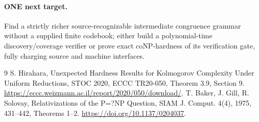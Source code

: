 \documentclass[11pt]{article}
\begin{document}
\paragraph{ONE next target.} Find a strictly richer source-recognizable intermediate congruence grammar without a supplied finite codebook; either build a polynomial-time discovery/coverage verifier or prove exact coNP-hardness of its verification gate, fully charging source and machine interfaces.

\begin{thebibliography}{9}
 S. Hirahara, Unexpected Hardness Results for Kolmogorov Complexity Under Uniform Reductions, STOC 2020, ECCC TR20-050, Theorem 3.9, Section 9. \url{https://eccc.weizmann.ac.il/report/2020/050/download/}.
 T. Baker, J. Gill, R. Solovay, Relativizations of the P=?NP Question, SIAM J. Comput. 4(4), 1975, 431--442, Theorems 1--2. \url{https://doi.org/10.1137/0204037}.
\end{thebibliography}
\end{document}
